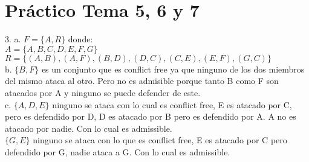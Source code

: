 \chapter{Práctico Tema 5, 6 y 7}

3. 
a. $F=\{A, R\}$ donde: \\
$A=\{A, B, C, D, E, F, G\}$ \\
$R=\{(A, B), (A, F), (B, D), (D, C), (C, E), (E, F), (G, C)\}$ \\

b. $\{B, F\}$ es un conjunto que es conflict free ya que ninguno de los dos miembros del mismo ataca al otro. Pero no es admisible porque tanto B como F son atacados por A y ninguno se puede defender de este.\\

c. $\{A, D, E\}$ ninguno se ataca con lo cual es conflict free, E es atacado por C, pero es defendido por D, D es atacado por B pero es defendido por A. A no es atacado por nadie. Con lo cual es admissible. \\

$\{G, E\}$ ninguno se ataca con lo que es conflict free, E es atacado por C pero defendido por G, nadie ataca a G. Con lo cual es admissible.

\bigskip